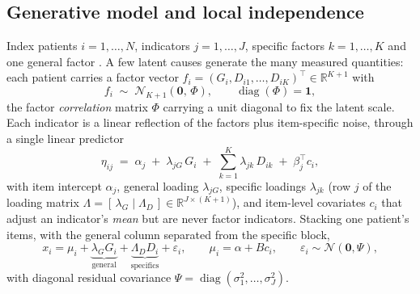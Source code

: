 \subsection{Generative model and local independence}
\label{annA:gen}

Index patients $i=1,\dots,N$, indicators $j=1,\dots,J$, specific factors $k=1,\dots,K$
and one general factor \Gfac. A few latent causes generate the many measured
quantities: each patient carries a factor vector
$f_i=(G_i,D_{i1},\dots,D_{iK})^{\top}\in\mathbb{R}^{K+1}$ with
\begin{equation}
  f_i \;\sim\; \mathcal{N}_{K+1}\!\left(\mathbf{0},\,\Phi\right),
  \qquad \operatorname{diag}(\Phi)=\mathbf{1},
  \label{eqA:factors}
\end{equation}
the factor \emph{correlation} matrix $\Phi$ carrying a unit diagonal to fix the latent
scale. Each indicator is a linear reflection of the factors plus item-specific noise,
through a single linear predictor
\begin{equation}
  \eta_{ij} \;=\; \alpha_j \;+\; \lambda_{jG}\,G_i \;+\; \sum_{k=1}^{K}\lambda_{jk}\,D_{ik}
  \;+\; \beta_j^{\top} c_i ,
  \label{eqA:linpred}
\end{equation}
with item intercept $\alpha_j$, general loading $\lambda_{jG}$, specific loadings
$\lambda_{jk}$ (row $j$ of the loading matrix
$\Lambda=[\,\lambda_G\mid\Lambda_D\,]\in\mathbb{R}^{J\times(K+1)}$), and item-level
covariates $c_i$ that adjust an indicator's \emph{mean} but are never factor
indicators. Stacking one patient's items, with the general column separated from the
specific block,
\begin{equation}
  x_i=\mu_i+\underbrace{\lambda_G G_i}_{\text{general}}+\underbrace{\Lambda_D D_i}_{\text{specifics}}+\varepsilon_i,
  \qquad \mu_i=\alpha+B c_i,\qquad \varepsilon_i\sim\mathcal{N}(\mathbf 0,\Psi),
  \label{eqA:xstack}
\end{equation}
with diagonal residual covariance $\Psi=\operatorname{diag}(\sigma_1^2,\dots,\sigma_J^2)$.

